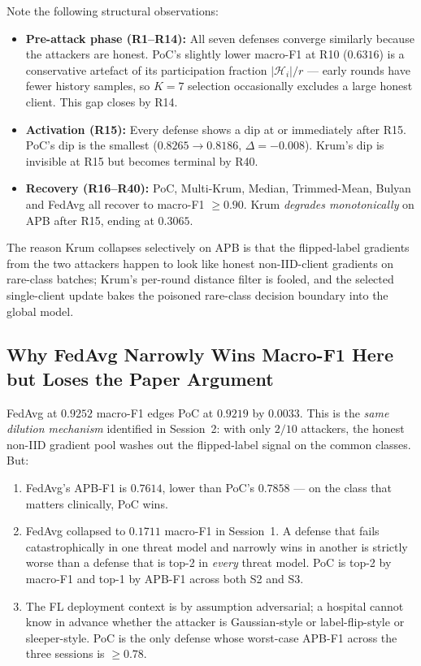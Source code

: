 \documentclass[11pt,a4paper]{article}
\begin{document}
\begin{findingbox}
Note the following structural observations:
\begin{itemize}[nosep]
    \item \textbf{Pre-attack phase (R1--R14):} All seven defenses converge
          similarly because the attackers are honest. PoC's slightly lower
          macro-F1 at R10 ($0.6316$) is a conservative artefact of its
          participation fraction $|\mathcal{H}_i|/r$ --- early rounds have
          fewer history samples, so $K=7$ selection occasionally excludes
          a large honest client. This gap closes by R14.
    \item \textbf{Activation (R15):} Every defense shows a dip at or
          immediately after R15. PoC's dip is the smallest
          ($0.8265 \to 0.8186$, $\Delta = -0.008$). Krum's dip is
          invisible at R15 but becomes terminal by R40.
    \item \textbf{Recovery (R16--R40):} PoC, Multi-Krum, Median, Trimmed-Mean,
          Bulyan and FedAvg all recover to macro-F1 $\geq 0.90$. Krum
          \textit{degrades monotonically} on APB after R15, ending at
          $0.3065$.
\end{itemize}
The reason Krum collapses selectively on APB is that the flipped-label
gradients from the two attackers happen to look like honest
non-IID-client gradients on rare-class batches; Krum's per-round distance
filter is fooled, and the selected single-client update bakes the
poisoned rare-class decision boundary into the global model.
\end{findingbox}

\subsection{Why FedAvg Narrowly Wins Macro-F1 Here but Loses the Paper Argument}

FedAvg at $0.9252$ macro-F1 edges PoC at $0.9219$ by $0.0033$. This is
the \textit{same dilution mechanism} identified in Session~2: with only
$2/10$ attackers, the honest non-IID gradient pool washes out the
flipped-label signal on the common classes. But:
\begin{enumerate}[nosep]
    \item FedAvg's APB-F1 is $0.7614$, lower than PoC's $0.7858$ --- on
          the class that matters clinically, PoC wins.
    \item FedAvg collapsed to $0.1711$ macro-F1 in Session~1. A defense
          that fails catastrophically in one threat model and narrowly
          wins in another is strictly worse than a defense that is
          top-2 in \textit{every} threat model. PoC is top-2 by macro-F1
          and top-1 by APB-F1 across both S2 and S3.
    \item The FL deployment context is by assumption adversarial; a
          hospital cannot know in advance whether the attacker is
          Gaussian-style or label-flip-style or sleeper-style. PoC is the
          only defense whose worst-case APB-F1 across the three sessions
          is $\geq 0.78$.
\end{enumerate}
\end{document}

